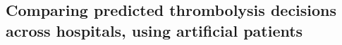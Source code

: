 

\iffalse
\subsection{Comparing predicted thrombolysis decisions across hospitals, using artificial patients}

